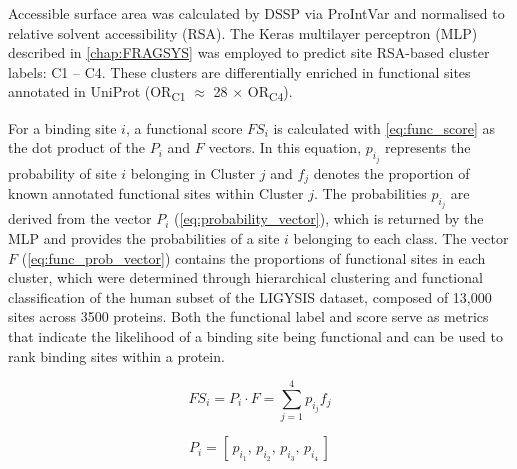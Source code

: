 Accessible surface area was calculated by DSSP \cite{KABSCH_1983_DSSP} via ProIntVar \cite{MACGOWAN_2020_DRSASP} and normalised \cite{TIEN_2013_RSA} to relative solvent accessibility (RSA). The Keras \cite{CHOLLET_2015_KERAS} multilayer perceptron (MLP) \cite{CYBENKO_1989_MLP} described in \autoref{chap:FRAGSYS} \cite{UTGES_2024_FRAGSYS} was employed to predict site RSA-based cluster labels: C1 – C4. These clusters are differentially enriched in functional sites annotated in UniProt \cite{NIGHTINGALE_2017_API} (OR\textsubscript{C1} $\approx$ 28 $\times$ OR\textsubscript{C4}).

For a binding site $i$, a functional score $FS_i$ is calculated with \autoref{eq:func_score} as the dot product of the $P_i$ and $F$ vectors. In this equation, $p_{i_{j}}$ represents the probability of site $i$ belonging in Cluster $j$ and $f_j$ denotes the proportion of known annotated functional sites within Cluster $j$. The probabilities $p_{i_{j}}$ are derived from the vector $P_i$ (\autoref{eq:probability_vector}), which is returned by the MLP and provides the probabilities of a site $i$ belonging to each class. The vector $F$ (\autoref{eq:func_prob_vector}) contains the proportions of functional sites in each cluster, which were determined through hierarchical clustering and functional classification of the human subset of the LIGYSIS dataset, composed of 13,000 sites across 3500 proteins. Both the functional label and score serve as metrics that indicate the likelihood of a binding site being functional and can be used to rank binding sites within a protein.

\begin{equation}
FS_i = P_i \cdot F = \sum_{j=1}^{4} p_{i_{j}} f_j
\label{eq:func_score}
\end{equation}

\vspace{-12pt} %
\vspace{-12pt} %

\begin{equation}
P_i = [\,p_{i_{1}},\,p_{i_{2}},\,p_{i_{3}},\,p_{i_{4}}\,]
\label{eq:probability_vector}
\end{equation}

\vspace{-12pt} %
\vspace{-12pt} %

